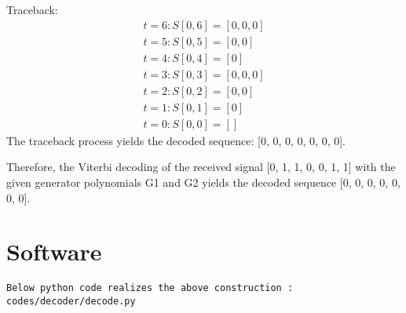 Traceback:
\begin{align}
t = 6: S[0, 6] = [0, 0, 0]\\
t = 5: S[0, 5] = [0, 0]\\
t = 4: S[0, 4] = [0]\\
t = 3: S[0, 3] = [0, 0, 0]\\
t = 2: S[0, 2] = [0, 0]\\
t = 1: S[0, 1] = [0]\\
t = 0: S[0, 0] = []
\end{align}
The traceback process yields the decoded sequence: [0, 0, 0, 0, 0, 0, 0].

Therefore, the Viterbi decoding of the received signal [0, 1, 1, 0, 0, 1, 1] with the given generator polynomials G1 and G2 yields the decoded sequence [0, 0, 0, 0, 0, 0, 0].
\section{Software}
\begin{center}
 \begin{lstlisting}
Below python code realizes the above construction :
codes/decoder/decode.py
 \end{lstlisting}
\end{center}
